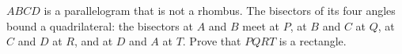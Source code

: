 $ABCD$ is a parallelogram that is not a rhombus. The bisectors of its four angles bound a quadrilateral: the bisectors at $A$ and $B$ meet at $P$, at $B$ and $C$ at $Q$, at $C$ and $D$ at $R$, and at $D$ and $A$ at $T$. Prove that $PQRT$ is a rectangle.
